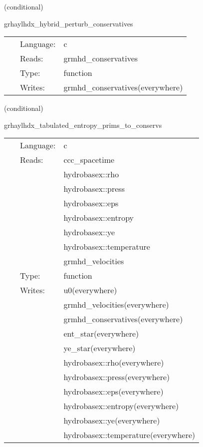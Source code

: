 \vspace{5mm}

   (conditional) 

\hspace{5mm} grhaylhdx\_hybrid\_perturb\_conservatives 

\hspace{5mm}{\it hybrid version of grhaylhdx\_perturb\_conservatives } 


\hspace{5mm}

 \begin{tabular*}{160mm}{cll} 
~ & Language:  & c \\ 
~ & Reads:  & grmhd\_conservatives \\ 
~ & Type:  & function \\ 
~ & Writes:  & grmhd\_conservatives(everywhere) \\ 
\end{tabular*} 


\vspace{5mm}

   (conditional) 

\hspace{5mm} grhaylhdx\_tabulated\_entropy\_prims\_to\_conservs 

\hspace{5mm}{\it entropy+tabulated version of grhaylhdx\_prims\_to\_conservs } 


\hspace{5mm}

 \begin{tabular*}{160mm}{cll} 
~ & Language:  & c \\ 
~ & Reads:  & ccc\_spacetime \\ 
~& ~ &hydrobasex::rho\\ 
~& ~ &hydrobasex::press\\ 
~& ~ &hydrobasex::eps\\ 
~& ~ &hydrobasex::entropy\\ 
~& ~ &hydrobasex::ye\\ 
~& ~ &hydrobasex::temperature\\ 
~& ~ &grmhd\_velocities\\ 
~ & Type:  & function \\ 
~ & Writes:  & u0(everywhere) \\ 
~& ~ &grmhd\_velocities(everywhere)\\ 
~& ~ &grmhd\_conservatives(everywhere)\\ 
~& ~ &ent\_star(everywhere)\\ 
~& ~ &ye\_star(everywhere)\\ 
~& ~ &hydrobasex::rho(everywhere)\\ 
~& ~ &hydrobasex::press(everywhere)\\ 
~& ~ &hydrobasex::eps(everywhere)\\ 
~& ~ &hydrobasex::entropy(everywhere)\\ 
~& ~ &hydrobasex::ye(everywhere)\\ 
~& ~ &hydrobasex::temperature(everywhere)\\ 
\end{tabular*} 


